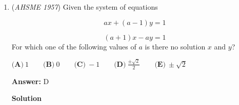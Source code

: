 \begin{enumerate}
 



\textbf{Solution 2}

We know that if a parabola is given by $ax^2+bx+c$, then the $x$-value of the vertex is $\frac{-b}{2a}$ (this fact can be proven with the \href{https://artofproblemsolving.com/wiki/index.php?title=Quadratic\_formula}{quadratic formula} and also \href{https://artofproblemsolving.com/wiki/index.php?title=Derivative}{derivatives}). Because, in this case, $a=-1$, $x=\frac{-b}{2a}=\frac b 2$. Thus, at $x=\frac b 2$, the parabola should have a $y$-value of $0$. Therefore, we have the following equation that we can solve for $b$:\begin{align*}y|_{x=\frac b 2} = -(\frac b 2)^2-b \cdot (\frac b 2)-8 &= 0\\-\frac{b^2}4+\frac{b^2}2 &= 8 \\\frac{b^2}4 &= 8 \\b^2 &= 32 \\b &= \pm \sqrt{32} = \pm 4\sqrt2\end{align*}
Because both of these results are irrational with one positive and one negtaive solution, we choose answer $\fbox{\textbf{(D)} a positive or a negative irrational number}$.

 


	\item (\textit{AHSME 1957}) Given the system of equations 

 \[ax + (a - 1)y = 1\]

 \[(a + 1)x - ay = 1\]
For which one of the following values of $a$ is there no solution $x$ and $y$? 


 $\textbf{(A)}\ 1\qquad  \textbf{(B)}\ 0\qquad  \textbf{(C)}\ - 1\qquad  \textbf{(D)}\ \frac {\pm \sqrt {2}}{2}\qquad  \textbf{(E)}\ \pm\sqrt{2}$

 \textbf{Answer: }D



\textbf{Solution}


\end{enumerate}
